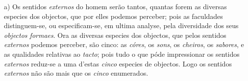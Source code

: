 
 

a) Os sentidos \emph{externos} do homem serão tantos, quantas forem as diversas especies dos objectos, que por elles podemos perceber; pois as faculdades distinguem-se, ou especificam-se, em ultima analyse, pela diversidade dos seus \emph{objectos formaes}. Ora as diversas especies dos objectos, que pelos sentidos \emph{externos} podemos perceber, são cinco: as \emph{córes}, os \emph{sons}, os \emph{cheiros}, os \emph{sabores}, e as qualidades relativas ao \emph{tacto}; pois tudo o que póde impressionar os sentidos \emph{externos} reduz-se a uma d'estas \emph{cinco} especies de objectos. Logo os sentidos \emph{externos} não são mais que os \emph{cinco} enumerados.

